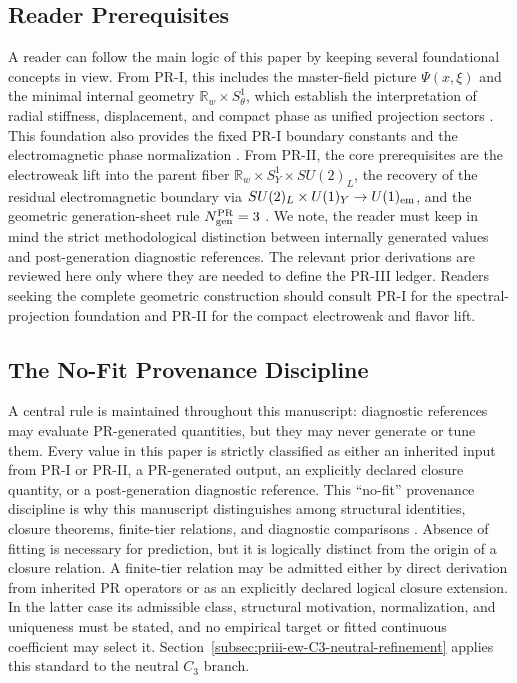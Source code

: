 \documentclass[11pt]{article}
\begin{document}
\subsection{Reader Prerequisites}
\label{subsec:priii-reader-prerequisites}

A reader can follow the main logic of this paper by keeping several foundational concepts in view. From PR-I, this includes the master-field picture $\Psi(x,\xi)$ and the minimal internal geometry $\mathbb{R}_w\times S^1_\theta$, which establish the interpretation of radial stiffness, displacement, and compact phase as unified projection sectors \cite{OshetskiPR1Zenodo2026}. %
This foundation also provides the fixed PR-I boundary constants and the electromagnetic phase normalization \cite{OshetskiPR2Zenodo2026}. %
From PR-II, the core prerequisites are the electroweak lift into the parent fiber $\mathbb{R}_w\times S_Y^1\times SU(2)_L$, the recovery of the residual electromagnetic boundary via $SU(2)_L\times U(1)_Y\to U(1)_{\rm em}$, and the geometric generation-sheet rule $N_{\rm gen}^{\rm PR}=3$ \cite{OshetskiPR2Zenodo2026}. %
We note, the reader must keep in mind the strict methodological distinction between internally generated values and post-generation diagnostic references. The relevant prior derivations are reviewed here only where they are needed to define the PR-III ledger. Readers seeking the complete geometric construction should consult PR-I for the spectral-projection foundation and PR-II for the compact electroweak and flavor lift.

\subsection{The No-Fit Provenance Discipline}
\label{subsec:priii-no-fit-discipline}

A central rule is maintained throughout this manuscript: diagnostic references may evaluate PR-generated quantities, but they may never generate or tune them. Every value in this paper is strictly classified as either an inherited input from PR-I or PR-II, a PR-generated output, an explicitly declared closure quantity, or a post-generation diagnostic reference. This ``no-fit'' provenance discipline is why this manuscript distinguishes among structural identities, closure theorems, finite-tier relations, and diagnostic comparisons \cite{OshetskiPR1Zenodo2026}.  Absence of fitting is necessary for prediction, but it is logically distinct from the origin of a closure relation.  A finite-tier relation may be admitted either by direct derivation from inherited PR operators or as an explicitly declared logical closure extension.  In the latter case its admissible class, structural motivation, normalization, and uniqueness must be stated, and no empirical target or fitted continuous coefficient may select it.  Section~\ref{subsec:priii-ew-C3-neutral-refinement} applies this standard to the neutral \(C_3\) branch.
\end{document}
